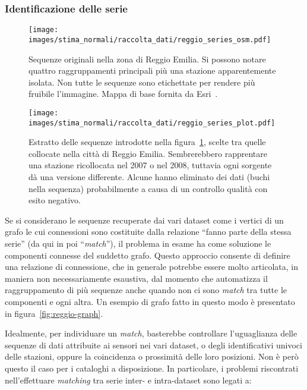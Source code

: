 \subsubsection{Identificazione delle serie}
\begin{figure}[ht]
  \centering
  \texttt{[image: images/stima\_normali/raccolta\_dati/reggio\_series\_osm.pdf]}
  \caption{\small Sequenze originali nella zona di Reggio Emilia. Si possono notare quattro raggruppamenti principali più una stazione apparentemente isolata. Non tutte le sequenze sono etichettate per rendere più fruibile l'immagine. Mappa di base fornita da Esri~\autocite{esriWorldTopographicMap2013}.}\label{fig:reggio-osm}
\end{figure}
\begin{figure}[ht]
  \centering
  \texttt{[image: images/stima\_normali/raccolta\_dati/reggio\_series\_plot.pdf]}
  \caption{\small Estratto delle sequenze introdotte nella figura~\ref{fig:reggio-osm}, scelte tra quelle collocate nella città di Reggio Emilia. Sembrerebbero rapprentare una stazione ricollocata nel 2007 o nel 2008, tuttavia ogni sorgente dà una versione differente. Alcune hanno eliminato dei dati (buchi nella sequenza) probabilmente a causa di un controllo qualità con esito negativo.}\label{fig:reggio-plot}
\end{figure}
Se si considerano le sequenze recuperate dai vari dataset come i vertici di un grafo le cui connessioni sono costituite dalla relazione ``fanno parte della stessa serie'' (da qui in poi ``\emph{match}''), il problema in esame ha come soluzione le componenti connesse del suddetto grafo. Questo approccio consente di definire una relazione di connessione, che in generale potrebbe essere molto articolata, in maniera non necessariamente esaustiva, dal momento che automatizza il raggruppamento di più sequenze anche quando non ci sono \emph{match} tra tutte le componenti e ogni altra. Un esempio di grafo fatto in questo modo è presentato in figura~\ref{fig:reggio-graph}.

Idealmente, per individuare un \emph{match}, basterebbe controllare l'uguaglianza delle sequenze di dati attribuite ai sensori nei vari dataset, o degli identificativi univoci delle stazioni, oppure la coincidenza o prossimità delle loro posizioni. Non è però questo il caso per i cataloghi a disposizione. In particolare, i problemi riscontrati nell'effettuare \emph{matching} tra serie inter- e intra-dataset sono legati a:

